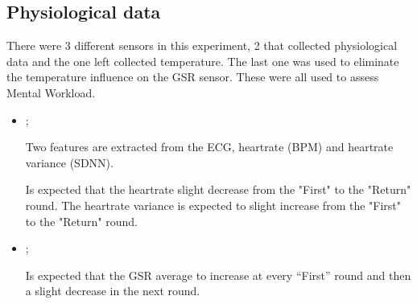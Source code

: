 \subsection{Physiological data}

There were 3 different sensors in this experiment, 2 that collected physiological data and the one left collected temperature. The last one was used to eliminate the temperature influence on the GSR sensor. These were all used to assess Mental Workload.

\begin{itemize}
    \item {};
    
        Two features are extracted from the ECG, heartrate (BPM) and heartrate variance (SDNN).
    
        Is expected that the heartrate slight decrease from the "First" to the "Return" round. The heartrate variance is expected to slight increase from the "First" to the "Return" round.
    

    \item {};
    
        Is expected that the GSR average to increase at every “First” round and then a slight decrease in the next round.

\end{itemize}


